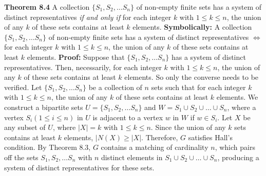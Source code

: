 \nopagenumbers
{\bf Theorem 8.4}
\vskip 6pt
A collection $ \lbrace S_1,S_2, \ldots S_n \rbrace$ of non-empty finite sets has a system of distinct representatives {\it if and only if}  for each integer $k$ with $1 \leq k \leq n$, the union of any $k$
of these sets contains at least $k$ elements.
\vskip 10pt
{\bf Symbolically:}
A collection $ \lbrace S_1,S_2, \ldots S_n \rbrace$ of non-empty finite sets has a system of distinct representatives $\Leftrightarrow$  for each integer $k$ with $1 \leq k \leq n$, the union of any $k$
of these sets contains at least $k$ elements.
\vskip 10pt
{\bf Proof:}
\vskip 6pt
Suppose that $ \lbrace S_1,S_2, \ldots S_n \rbrace$ has a system of distinct representatives. Then, necessarily, for each integer $k$ with $1 \leq k \leq n$, the union of any $k$ of these sets contains at least $k$ elements. So only the converse needs to be verified.
\vskip 1mm
Let $ \lbrace S_1,S_2, \ldots S_n \rbrace$ be a collection of $n$ sets such that for each integer $k$ with $1 \leq k \leq n$, the union of any $k$ of these sets contains at least $k$ elements. We construct a
bipartite sets $U= \lbrace S_1,S_2, \ldots S_n \rbrace$ and $W=S_1 \cup S_2 \cup \ldots \cup S_n$, where a vertex $S_i(1 \leq i \leq n)$ in $U$ is adjacent to a vertex $w$ in $W$ if $w \in S_i$. Let $X$ be any
subset of $U$, where $|X|=k$ with $1 \leq k \leq n$. Since the union of any $k$ sets contains at least $k$ elements, $|N(X) \geq |X|$. Therefore, $G$ satisfies Hall's condition. By Theorem 8.3, $G$ contains
a matching of cardinality $n$, which pairs off the sets $S_1,S_2, \ldots S_n$ with $n$ distinct elements in $ S_1 \cup S_2 \cup \ldots \cup S_n$, producing a system of distinct representatives for these sets.

\vfill\eject

